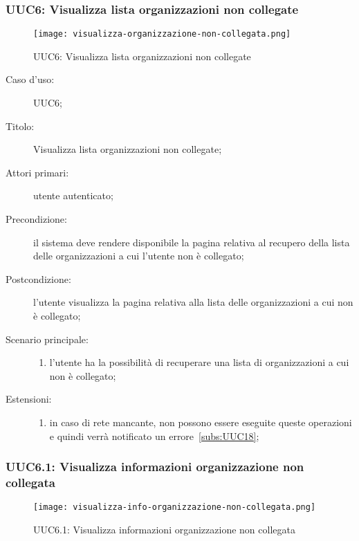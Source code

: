 \documentclass[../../../analisi-dei-requisiti.tex]{subfiles}
\begin{document}
\subsubsection{UUC6: Visualizza lista organizzazioni non collegate}%
\label{subs:UUC6}

\begin{figure}[H]
  \centering
  \texttt{[image: visualizza-organizzazione-non-collegata.png]}
  \caption{UUC6: Visualizza lista organizzazioni non collegate}%
  \label{fig:UUC6}
\end{figure}

\begin{description}
  \item[Caso d'uso:] UUC6;
  \item[Titolo:] Visualizza lista organizzazioni non collegate;
  \item[Attori primari:] utente autenticato;
  \item[Precondizione:] il sistema deve rendere disponibile la pagina relativa al recupero della lista delle organizzazioni a cui l'utente non è collegato;
  \item[Postcondizione:] l'utente visualizza la pagina relativa alla lista delle organizzazioni a cui non è collegato;
  \item[Scenario principale:]
        \begin{enumerate}
          \item l'utente ha la possibilità di recuperare una lista di organizzazioni a cui non è collegato;
        \end{enumerate}
  \item[Estensioni:]
        \begin{enumerate}
          \item in caso di rete mancante, non possono essere eseguite queste operazioni e quindi verrà notificato un errore~\ref{subs:UUC18};
        \end{enumerate}
\end{description}

\subsubsection{UUC6.1: Visualizza informazioni organizzazione non collegata}%
\label{subs:UUC6.1}

\begin{figure}[H]
  \centering
  \texttt{[image: visualizza-info-organizzazione-non-collegata.png]}
  \caption{UUC6.1: Visualizza informazioni organizzazione non collegata}%
  \label{fig:UUC6.1}
\end{figure}
\end{document}
